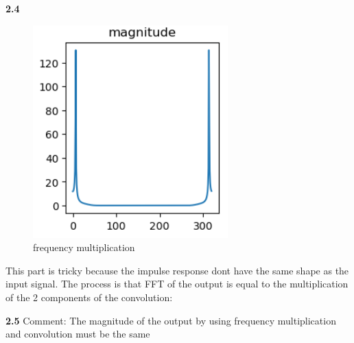 \documentclass{article}
\begin{document}
\textbf{2.4}
\begin{figure}[H]
         \centering
          \includegraphics[width=.7\linewidth]{2.4.PNG}
         \caption{frequency multiplication}

\end{figure}
This part is tricky because the impulse response dont have the same shape as the input signal.\newline
The process is that FFT of the output is equal to the multiplication of the 2 components of the convolution:\newline

\textbf{2.5}
Comment: The magnitude of the output by using frequency multiplication and convolution must be the same
\end{document}
